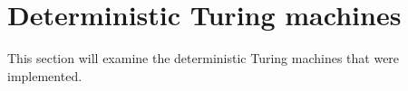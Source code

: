 \section{Deterministic Turing machines}

This section will examine the deterministic Turing machines that were implemented.







